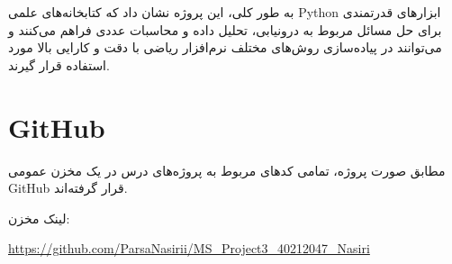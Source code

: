 \documentclass[12pt]{article}
\begin{document}
به طور کلی، این پروژه نشان داد که کتابخانه‌های علمی Python ابزارهای قدرتمندی برای حل مسائل مربوط به درونیابی، تحلیل داده و محاسبات عددی فراهم می‌کنند و می‌توانند در پیاده‌سازی روش‌های مختلف نرم‌افزار ریاضی با دقت و کارایی بالا مورد استفاده قرار گیرند.

\section{GitHub}

مطابق صورت پروژه، تمامی کدهای مربوط به پروژه‌های درس در یک مخزن عمومی GitHub قرار گرفته‌اند.

لینک مخزن:

\begin{center}
\url{https://github.com/ParsaNasirii/MS_Project3_40212047_Nasiri}
\end{center}
\end{document}
